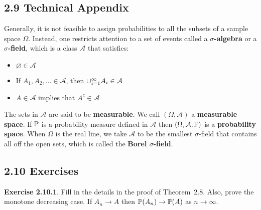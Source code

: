 \subsection*{2.9 Technical Appendix}
Generally, it is not feasible to assign probabilities to all the subsets of a sample space \(\Omega\). Instead, one restricts attention to a set of events called a \textbf{\(\sigma\)-algebra} or a \textbf{\(\sigma\)-field}, which is a class \(\mathcal{A}\) that satisfies:
\begin{itemize}[tightlist]
\item
  \(\varnothing \in \mathcal{A}\)
\item
  If \(A_{1}, A_{2}, \dots \in \mathcal{A}\), then
  \(\cup_{i=1}^{\infty} A_{i} \in \mathcal{A}\)
\item
  \(A \in \mathcal{A}\) implies that \(A^{c} \in \mathcal{A}\)
\end{itemize}
The sets in \(\mathcal{A}\) are said to be \textbf{measurable}. We call \((\Omega, \mathcal{A})\) a \textbf{measurable space}. If \(\operatorname{\mathbb{P}}\) is a probability measure defined in \(\mathcal{A}\) then \((\Omega, \mathcal{A}, \operatorname{\mathbb{P}})\) is a \textbf{probability space}. When \(\Omega\) is the real line, we take \(\mathcal{A}\) to be the smallest \(\sigma\)-field that contains all off the open sets, which is called the \textbf{Borel \(\sigma\)-field}.

\subsection*{2.10 Exercises}

\textbf{Exercise 2.10.1}. Fill in the details in the proof of Theorem~2.8. Also, prove the monotone decreasing case.
If \(A_{n} \rightarrow A\) then \(\operatorname{\mathbb{P}}(A_{n}) \rightarrow \operatorname{\mathbb{P}}(A)\) as \(n \rightarrow \infty\).

